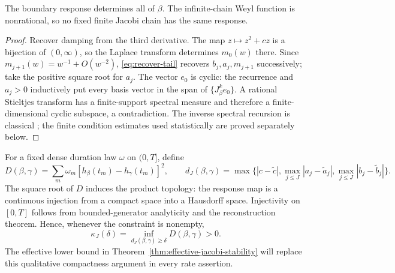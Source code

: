 \begin{theorem}
\label{thm:jacobi-reconstruction}
The boundary response determines all of \(\beta\). The infinite-chain
Weyl function is nonrational, so no fixed finite Jacobi chain has the same
response.
\end{theorem}
\begin{proof}
Recover damping from the third derivative. The map \(z\mapsto z^2+cz\)
is a bijection of \((0,\infty)\), so the Laplace transform determines
\(m_0(w)\) there. Since \(m_{j+1}(w)=w^{-1}+O(w^{-2})\),
\eqref{eq:recover-tail} recovers \(b_j,a_j,m_{j+1}\) successively; take
the positive square root for \(a_j\).
The vector \(e_0\) is cyclic: the recurrence and \(a_j>0\) inductively
put every basis vector in the span of \(\{J_\beta^ke_0\}\).
A rational Stieltjes transform has a finite-support spectral measure and
therefore a finite-dimensional cyclic subspace, a contradiction.
The inverse spectral recursion is classical \cite{Teschl2000}; the finite
condition estimates used statistically are proved separately below.
\end{proof}

For a fixed dense duration law \(\omega\) on \((0,T]\), define
\begin{equation}
 D(\beta,\gamma)=\sum_m\omega_m
 [h_\beta(t_m)-h_\gamma(t_m)]^2,\qquad
 d_J(\beta,\gamma)=\max\{|c-\widetilde c|,
 \max_{j\le J}|a_j-\widetilde a_j|,\max_{j\le J}|b_j-\widetilde b_j|\}.
 \label{eq:response-metric}
\end{equation}
The square root of \(D\) induces the product topology: the response map
is a continuous injection from a compact space into a Hausdorff space.
Injectivity on \([0,T]\) follows from bounded-generator analyticity and
the reconstruction theorem. Hence, whenever the constraint is nonempty,
\begin{equation}
 \kappa_J(\delta)=\inf_{d_J(\beta,\gamma)\ge\delta}D(\beta,\gamma)>0.
 \label{eq:jacobi-separation-modulus}
\end{equation}
The effective lower bound in Theorem~\ref{thm:effective-jacobi-stability}
will replace this qualitative compactness argument in every rate assertion.

